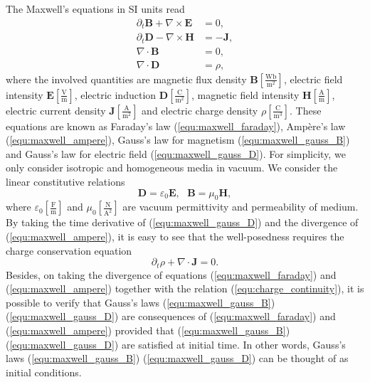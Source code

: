 \documentclass{article}
\begin{document}
The Maxwell's equations in SI units read
\begin{subequations}
\begin{align}
    \partial_t \mathbf{B} + \nabla \times \mathbf{E} &= 0, \label{equ:maxwell_faraday} \\ 
    \partial_t \mathbf{D} - \nabla \times \mathbf{H} &= -\mathbf{J}, \label{equ:maxwell_ampere} \\
    \nabla \cdot \mathbf{B} &= 0,  \label{equ:maxwell_gauss_B}\\
    \nabla \cdot \mathbf{D} &= \rho, \label{equ:maxwell_gauss_D}
\end{align}
\end{subequations}
where the involved quantities are magnetic flux density $\mathbf{B}[\frac{\text{Wb}}{\text{m}^2}]$, electric field intensity $\mathbf{E}[\frac{\text{V}}{\text{m}}]$, electric induction $\mathbf{D}[\frac{\text{C}}{\text{m}^2}]$, magnetic field intensity $\mathbf{H}[\frac{\text{A}}{\text{m}}]$, electric current density $\mathbf{J}[\frac{\text{A}}{\text{m}^2}]$ and electric charge density $\rho[\frac{\text{C}}{\text{m}^3}]$. These equations are known as Faraday's law (\ref{equ:maxwell_faraday}), Amp\`{e}re's law (\ref{equ:maxwell_ampere}), Gauss's law for magnetism (\ref{equ:maxwell_gauss_B}) and Gauss's law for electric field (\ref{equ:maxwell_gauss_D}). For simplicity, we only consider isotropic and homogeneous media in vacuum. We consider the linear constitutive relations 
\begin{equation} \label{equ:material_law}
    \mathbf{D} = \varepsilon_0 \mathbf{E}, \ \ \ \mathbf{B} = \mu_0\mathbf{H}, 
\end{equation}
where $\varepsilon_0[\frac{\text{F}}{\text{m}}]$ and $\mu_0[\frac{\text{N}}{\text{A}^{2}}]$ are vacuum permittivity and permeability of medium. By taking the time derivative of (\ref{equ:maxwell_gauss_D}) and the divergence of (\ref{equ:maxwell_ampere}), it is easy to see that the well-posedness requires the charge conservation equation
\begin{equation} \label{equ:charge_continuity}
    \partial_t\rho + \nabla \cdot \mathbf{J} = 0.
\end{equation}
Besides, on taking the divergence of equations (\ref{equ:maxwell_faraday}) and (\ref{equ:maxwell_ampere}) together with the relation (\ref{equ:charge_continuity}), it is possible to verify that Gauss's laws (\ref{equ:maxwell_gauss_B}) (\ref{equ:maxwell_gauss_D}) are consequences of (\ref{equ:maxwell_faraday}) and (\ref{equ:maxwell_ampere}) provided that (\ref{equ:maxwell_gauss_B}) (\ref{equ:maxwell_gauss_D}) are satisfied at initial time. In other words, Gauss's laws (\ref{equ:maxwell_gauss_B}) (\ref{equ:maxwell_gauss_D}) can be thought of as initial conditions. 
\end{document}
